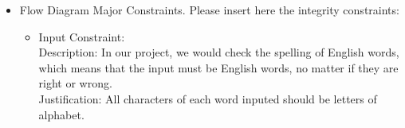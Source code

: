 \begin{itemize}
\item{  Flow Diagram Major Constraints.}
Please insert here the integrity constraints:
\begin{itemize} 
\item{ Input Constraint: } \\
Description: In our project, we would check the spelling of English words, which means that the input must be English words, no matter if they are right or wrong. \\
Justification: All characters of each word inputed should be letters of alphabet. 
\end{itemize}
\end{itemize}

